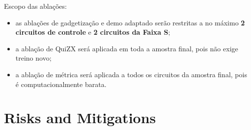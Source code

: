\documentclass[a4paper,11pt]{article}
\begin{document}
Escopo das ablações:
\begin{itemize}
  \item as ablações de gadgetização e demo adaptado serão restritas a no máximo \textbf{2 circuitos de controle} e \textbf{2 circuitos da Faixa S};
  \item a ablação de QuiZX será aplicada em toda a amostra final, pois não exige treino novo;
  \item a ablação de métrica será aplicada a todos os circuitos da amostra final, pois é computacionalmente barata.
\end{itemize}

\section{Risks and Mitigations}
\end{document}
